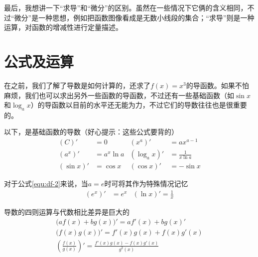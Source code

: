 最后，我想讲一下“求导”和“微分”的区别。虽然在一些情况下它俩的含义相同，不过“微分”是一种思想，例如把函数图像看成是无数小线段的集合；“求导”则是一种运算，对函数的增减性进行定量描述。

\section{公式及运算}
在之前，我们了解了导数是如何计算的，还求了$f(x)=x^3$的导函数。如果不怕麻烦，我们也可以求出另外一些函数的导函数，不过还有一些基础函数（如$\sin x$和$\log_ax$）的导函数以目前的水平还无能为力，不过它们的导数往往也是很重要的。

以下，是基础函数的导数（好心提示：这些公式要背的）
\begin{align}
    (C)'&=0 & (x^a)'&=ax^{a-1} \label{equ:df-1} \\
    (a^x)'&=a^x\ln a & (\log_ax)'&=\frac{1}{x\ln a} \label{equ:df-2} \\
    (\sin x)'&=\cos x & (\cos x)'&=-\sin x \label{equ:df-3}
\end{align}

对于公式\eqref{equ:df-2}来说，当$a=e$时可将其作为特殊情况记忆
\begin{align*}
    (e^x)'&=e^x & (\ln x)'=\frac{1}{x}
\end{align*}

导数的四则运算与代数相比差异是巨大的
\begin{gather}
    \big(af(x)+bg(x)\big)'=af'(x)+bg(x)' \label{equ:drule-1} \\
    \big(f(x)g(x)\big)'=f'(x)g(x)+f(x)g'(x) \label{equ:drule-2} \\
	\left(\frac{f(x)}{g(x)}\right)'=\frac{f'(x)g(x)-f(x)g'(x)}{g^2(x)} \label{equ:drule-3}
\end{gather}

